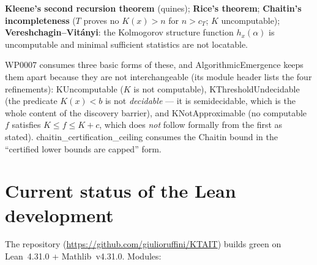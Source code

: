 \documentclass[11pt,a4paper]{article}
\newcommand{\lean}[1]{{\ttfamily\small
  \let\leanunderscore\_\def\_{\leanunderscore\allowbreak}#1}}
\begin{document}
\begin{defbox}
\textbf{Kleene's second recursion theorem} (quines); \textbf{Rice's theorem};
\textbf{Chaitin's incompleteness} ($T$ proves no $K(x)>n$ for $n>c_T$; $K$ uncomputable);
\textbf{Vereshchagin--Vitányi}: the Kolmogorov structure function $h_x(\alpha)$ is uncomputable
and minimal sufficient statistics are not locatable.

\smallskip
WP0007 consumes three basic forms of these, and \lean{AlgorithmicEmergence} keeps them
apart because they are not interchangeable (its module header lists the four refinements): \lean{KUncomputable} ($K$ is not computable),
\lean{KThresholdUndecidable} (the predicate $K(x)<b$ is not \emph{decidable} --- it is
semidecidable, which is the whole content of the discovery barrier), and
\lean{KNotApproximable} (no computable $f$ satisfies $K\le f\le K+c$, which does \emph{not}
follow formally from the first as stated). \lean{chaitin\_certification\_ceiling} consumes the
Chaitin bound in the ``certified lower bounds are capped'' form.
\end{defbox}

\section{Current status of the Lean development}
\label{sec:status}

The repository (\url{https://github.com/giulioruffini/KTAIT}) builds green on Lean~4.31.0 +
Mathlib~v4.31.0. Modules:
\end{document}
